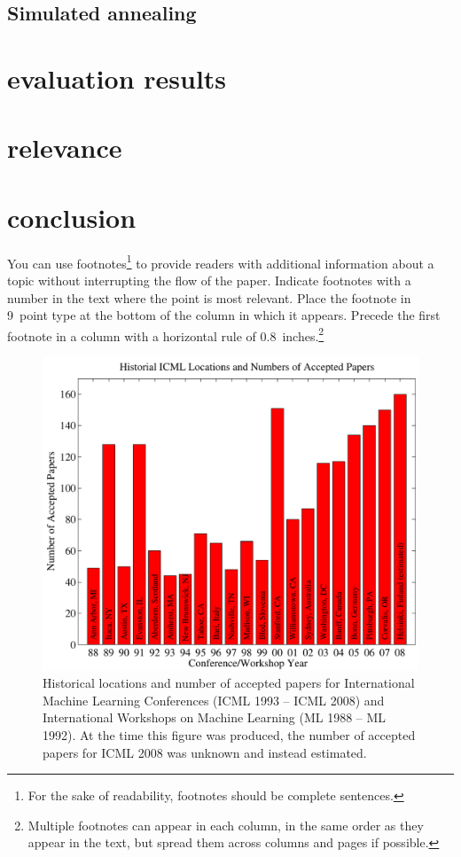 \documentclass{article}
\begin{document}
	\subsection{Simulated annealing}

\section{evaluation results}

\section{relevance}

\section{conclusion}



You can use footnotes\footnote{For the sake of readability, footnotes
should be complete sentences.} to provide readers with additional
information about a topic without interrupting the flow of the paper. 
Indicate footnotes with a number in the text where the point is most
relevant. Place the footnote in 9~point type at the bottom of the
column in which it appears. Precede the first footnote in a column
with a horizontal rule of 0.8~inches.\footnote{Multiple footnotes can
appear in each column, in the same order as they appear in the text,
but spread them across columns and pages if possible.}

\begin{figure}[ht]
\vskip 0.2in
\begin{center}
\centerline{\includegraphics[width=\columnwidth]{icml_numpapers}}
\caption{Historical locations and number of accepted papers for International
  Machine Learning Conferences (ICML 1993 -- ICML 2008) and
  International Workshops on Machine Learning (ML 1988 -- ML
  1992). At the time this figure was produced, the number of
  accepted papers for ICML 2008 was unknown and instead estimated.}
\label{icml-historical}
\end{center}
\vskip -0.2in
\end{figure} 
\end{document}
